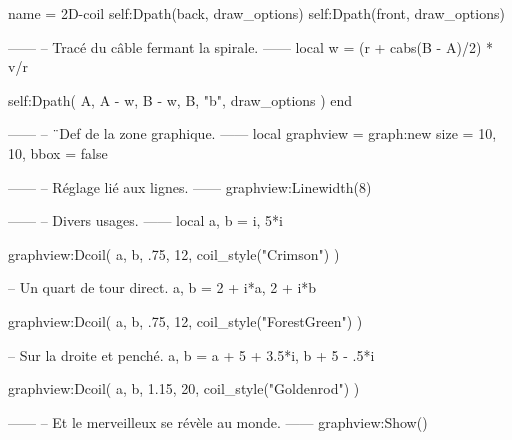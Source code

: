 \documentclass[varwidth]{standalone}
\begin{document}
\begin{luadraw}{name = 2D-coil}
  self:Dpath(back, draw_options)
  self:Dpath(front, draw_options)

------
-- Tracé du câble fermant la spirale.
------
  local w = (r + cabs(B - A)/2) * v/r

  self:Dpath(
    {A, A - w, B - w, B, "b"},
    draw_options
  )
end

------
-- ¨Def de la zone graphique.
------
local graphview = graph:new{
  size = {10, 10},
  bbox = false
}

------
-- Réglage lié aux lignes.
------
graphview:Linewidth(8)

------
-- Divers usages.
------
local a, b = i, 5*i

graphview:Dcoil(
  a, b,
  .75,
  12,
  coil_style("Crimson")
)

-- Un quart de tour direct.
a, b = 2 + i*a, 2 + i*b

graphview:Dcoil(
  a, b,
  .75,
  12,
  coil_style("ForestGreen")
)

-- Sur la droite et penché.
a, b = a + 5 + 3.5*i, b + 5 - .5*i

graphview:Dcoil(
  a, b,
  1.15,
  20,
  coil_style("Goldenrod")
)

------
-- Et le merveilleux se révèle au monde.
------
graphview:Show()
\end{luadraw}
\end{document}
